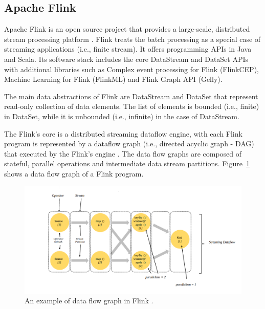 \documentclass[]{article}
\begin{document}
\subsection{Apache Flink}

\par Apache Flink is an open source project that provides a large-scale, distributed stream processing platform \cite{flink}. Flink treats the batch processing as a special case of streaming applications (i.e., finite stream).
It offers programming APIs in Java and Scala. Its software stack includes the core DataStream and DataSet APIs with additional libraries such as Complex event processing for Flink (FlinkCEP), Machine Learning for Flink (FlinkML)  and Flink Graph API (Gelly).

\par The main data abstractions of Flink are DataStream and DataSet that represent read-only collection of data elements. The list of elements is bounded (i.e., finite) in DataSet, while it is unbounded (i.e., infinite) in the case of DataStream.

\par The Flink's core is a distributed streaming dataflow engine,  with each Flink program is represented by a dataflow graph (i.e., directed acyclic graph - DAG) that executed by the Flink's engine \cite{flink_paper}. The data flow graphs are composed of stateful, parallel operations and intermediate data stream partitions. Figure~\ref{fig:fstream} shows a data flow graph of a Flink program.


\begin{figure}[h]

  \centering
    \includegraphics[width=\textwidth, height=.5\textheight]{flink_engine.png}
     \caption{ An example of data flow graph in Flink \cite{flink}.}
      \label{fig:fstream}
\end{figure} 
\newpage
\end{document}

